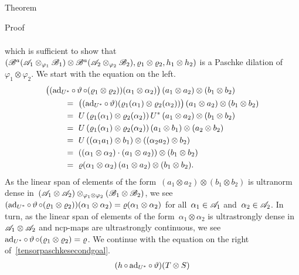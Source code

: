 \begin{parsec}
\begin{point}{Theorem}
\begin{point}{Proof}
\begin{point}
\begin{align}
    \end{align}
    which is sufficient to show that~$(
        \mathscr{B}^a(\mathscr{A}_1 \otimes_{\varphi_1} \mathscr{B}_1)
        \otimes \mathscr{B}^a(\mathscr{A}_2 \otimes_{\varphi_2} \mathscr{B}_2),
        \varrho_1 \otimes \varrho_2,
        h_1 \otimes h_2)$
    is a Paschke dilation of~$\varphi_1 \otimes \varphi_2$.
    We start with the equation on the left.
\begin{align*}
    &\bigl((\ad_{U^*} \after \vartheta \after  (\varrho_1 \otimes \varrho_2)) (\alpha_1 \otimes \alpha_2)\bigr)
    \, (a_1 \otimes a_2) \otimes (b_1 \otimes b_2) \\
    &\qquad \ = \ 
    \bigl((\ad_{U^*} \after \vartheta) (\varrho_1 (\alpha_1)\otimes \varrho_2(\alpha_2)) \bigr)
    \, (a_1 \otimes a_2) \otimes (b_1 \otimes b_2) \\
    &\qquad \ = \ 
    U \,(\varrho_1 (\alpha_1)\otimes \varrho_2(\alpha_2)) \, U^*
    \, (a_1 \otimes a_2) \otimes (b_1 \otimes b_2) \\
    &\qquad \ = \ 
    U \,(\varrho_1 (\alpha_1)\otimes \varrho_2(\alpha_2)) 
    \, (a_1 \otimes b_1) \otimes (a_2 \otimes b_2) \\
    &\qquad \ = \ 
    U \,  ((\alpha_1 a_1) \otimes b_1) \otimes ((\alpha_2 a_2) \otimes b_2) \\
    &\qquad \ = \ 
     ((\alpha_1 \otimes \alpha_2)\cdot (a_1 \otimes a_2)) \otimes (b_1 \otimes b_2) \\
    &\qquad \ = \ 
    \varrho(\alpha_1 \otimes\alpha_2) \,(a_1 \otimes a_2) \otimes (b_1 \otimes b_2).
\end{align*}
As the linear span of
    elements of the form~$(a_1 \otimes a_2) \otimes (b_1 \otimes b_2)$
    is ultranorm dense in~$(\mathscr{A}_1 \otimes \mathscr{A}_2)
                            \otimes_{\varphi_1 \otimes \varphi_2}
                            (\mathscr{B}_1 \otimes \mathscr{B}_2) $,
    we see~$(\mathrm{ad}_{U^*} \mathop{\circ} \vartheta \mathop{\circ} (\varrho_1 \otimes \varrho_2))
            (\alpha_1 \otimes \alpha_2)
            = \varrho(\alpha_1 \otimes \alpha_2)$
            for all~$\alpha_1\in\mathscr{A}_1$ and~$\alpha_2\in\mathscr{A}_2$.
In turn, as the linear span of elements of the form~$\alpha_1 \otimes \alpha_2$
    is ultrastrongly dense in~$\mathscr{A}_1 \otimes \mathscr{A}_2$
    and ncp-maps are ultrastrongly continuous,
    we see~$\mathrm{ad}_{U^*} \mathop{\circ} \vartheta \mathop{\circ} (\varrho_1 \otimes \varrho_2) =
        \varrho$.
        We continue with the equation on the right
        of~\eqref{tensorpaschkesecondgoal}.
\begin{align*}
    (h \after \ad_{U^*} \after \vartheta) (T \otimes S)

\end{align*}
\end{point}
\end{point}
\end{point}
\end{parsec}

